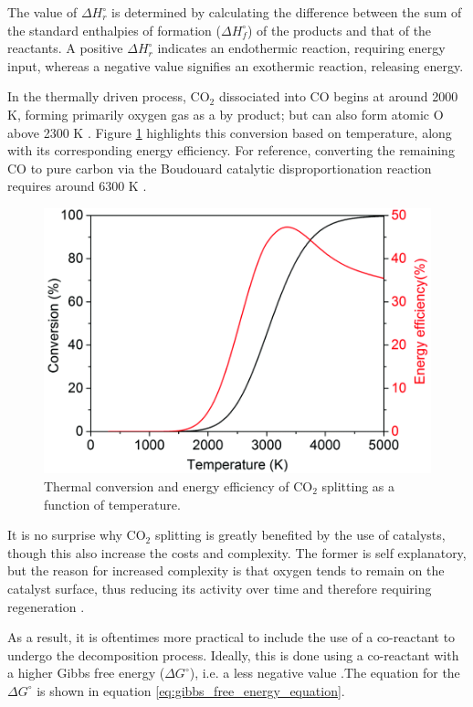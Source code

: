 The value of $\Delta H^\circ _r$ is determined by calculating the difference between the sum of the standard enthalpies of formation ($\Delta H^\circ_f$) of the products and that of the reactants. A positive $\Delta H^\circ_r$ indicates an endothermic reaction, requiring energy input, whereas a negative value signifies an exothermic reaction, releasing energy.

In the thermally driven process, CO$_2$ dissociated into CO begins at around 2000 K, forming primarily oxygen gas as a by product; but can also form atomic O above 2300 K \cite{Snoeckx2017, Centi2021}. Figure \ref{fig:thermal_co2_conversion} highlights this conversion based on temperature, along with its corresponding energy efficiency. For reference, converting the remaining CO to pure carbon via the Boudouard catalytic disproportionation reaction requires around 6300 K \cite{Centi2021}. 

\begin{figure}[h!]
	\centering
	\includegraphics[width=0.7\linewidth]{chapter_3/figures/thermal_co2_conversion.png}
	\caption{Thermal conversion and energy efficiency of CO$_2$ splitting as a function of temperature. \cite{Snoeckx2017}}
	\label{fig:thermal_co2_conversion}
\end{figure}

It is no surprise why CO$_2$ splitting is greatly benefited by the use of catalysts, though this also increase the costs and complexity. The former is self explanatory, but the reason for increased complexity is that oxygen tends to remain on the catalyst surface, thus reducing its activity over time and therefore requiring regeneration \cite{Shin2017}. 

As a result, it is oftentimes more practical to include the use of a co-reactant to undergo the decomposition process. Ideally, this is done using a co-reactant with a higher Gibbs free energy ($\Delta G^\circ$), i.e. a less negative value \cite{jiang_xiao_kuznetsov_edwards_2010}.The equation for the $\Delta G^\circ$ is shown in equation \ref{eq:gibbs_free_energy_equation}. 

